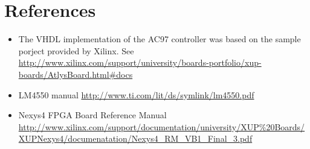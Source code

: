 \newpage
\section{References}
\begin{itemize}
\item The VHDL implementation of the AC97 controller was based on the sample porject provided by Xilinx. See \url{http://www.xilinx.com/support/university/boards-portfolio/xup-boards/AtlysBoard.html#docs} 
\item LM4550 manual \url{http://www.ti.com/lit/ds/symlink/lm4550.pdf}
\item Nexys4 FPGA Board Reference Manual \url{http://www.xilinx.com/support/documentation/university/XUP\%20Boards/XUPNexys4/documenatation/Nexys4_RM_VB1_Final_3.pdf}
\end{itemize}
